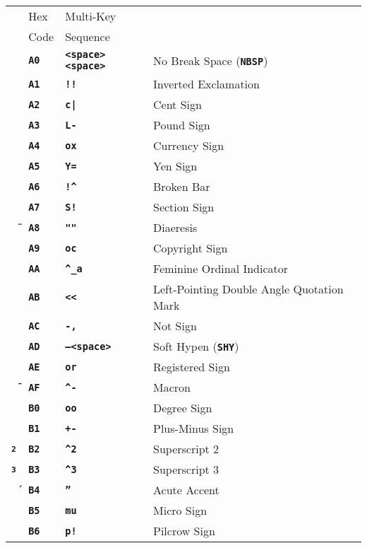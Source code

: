 \documentclass[12pt]{article}
\makeatletter
\newcommand{\TT}[1]{{\tt \bfseries #1}}
\newcommand{\ttkey}[1]{\TT{#1}\index{#1@{\tt #1}}}
\newlength{\figurewidth}
\newenvironment{boxedfigure}[1][!btp]%
	{\begin{figure*}[#1]
	 \begin{lrbox}{\figurebox}
	 \begin{minipage}{\figurewidth}

	 \vspace*{1ex}}%
	{
	 \vspace*{1ex}

	 \end{minipage}
	 \end{lrbox}

	 \vspace*{-15ex}
	 \centering
	 \fbox{\hspace*{0.1in}\usebox{\figurebox}\hspace*{0.1in}}
	 \end{figure*}}
\makeatother
\begin{document}
\begin{boxedfigure}[p]
\begin{tabular}{llll}
& Hex & Multi-Key \\
& Code & Sequence
\\[1ex]
\TT{~}
  & \TT{A0} & \TT{<space><space>} & No Break Space (\ttkey{NBSP}) \\
\TT{\textexclamdown}
  & \TT{A1} & \TT{!!} & Inverted Exclamation \\
\TT{\textcent}
  & \TT{A2} & \TT{c|} & Cent Sign \\
\TT{\textsterling}
  & \TT{A3} & \TT{L-} & Pound Sign \\
\TT{\textcurrency}
  & \TT{A4} & \TT{ox} & Currency Sign \\
\TT{\textyen}
  & \TT{A5} & \TT{Y=} & Yen Sign \\
\TT{\textbrokenbar}
  & \TT{A6} & \TT{!\textasciicircum} & Broken Bar \\
\TT{\textsection}
  & \TT{A7} & \TT{S!} & Section Sign \\
\TT{\"{~}}
  & \TT{A8} & \TT{""} & Diaeresis \\
\TT{\textcopyright}
  & \TT{A9} & \TT{oc} & Copyright Sign \\
\TT{\textordfeminine}
  & \TT{AA} & \TT{\textasciicircum\_a} & Feminine Ordinal Indicator \\
\TT{\guillemotleft}
  & \TT{AB} & \TT{<<} & Left-Pointing Double Angle Quotation Mark \\
\TT{\textlnot}
  & \TT{AC} & \TT{-,} & Not Sign \\
\TT{~}
  & \TT{AD} & \TT{--<space>} & Soft Hypen (\TT{SHY}) \\
\TT{\textregistered}
  & \TT{AE} & \TT{or} & Registered Sign \\
\TT{\={~}}
  & \TT{AF} & \TT{\textasciicircum-} & Macron \\
\TT{\textdegree}
  & \TT{B0} & \TT{oo} & Degree Sign \\
\TT{\textpm}
  & \TT{B1} & \TT{+-} & Plus-Minus Sign \\
\TT{\textsuperscript{2}}
  & \TT{B2} & \TT{\textasciicircum2} & Superscript 2 \\
\TT{\textsuperscript{3}}
  & \TT{B3} & \TT{\textasciicircum3} & Superscript 3 \\
\TT{\'{~}}
  & \TT{B4} & \TT{''} & Acute Accent \\
\TT{\textmu}
  & \TT{B5} & \TT{mu} & Micro Sign \\
\TT{\textpilcrow}
  & \TT{B6} & \TT{p!} & Pilcrow Sign \\

\end{tabular}
\end{boxedfigure}
\end{document}
